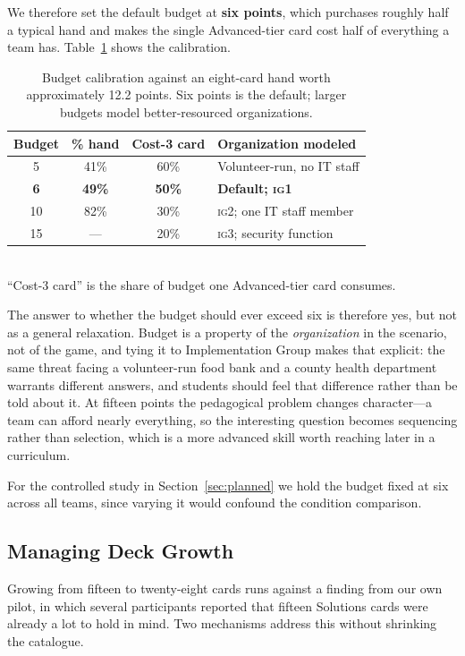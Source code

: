 \documentclass[10pt,twocolumn,letterpaper]{article}
\newcommand{\ig}[1]{\textsc{ig#1}}
\begin{document}
We therefore set the default budget at \textbf{six points}, which purchases
roughly half a typical hand and makes the single Advanced-tier card cost half of
everything a team has. Table~\ref{tab:budget} shows the calibration.

\begin{table}[h]
\centering
\caption{Budget calibration against an eight-card hand worth approximately 12.2
points. Six points is the default; larger budgets model better-resourced
organizations.}
\label{tab:budget}
\footnotesize
\begin{tabular}{@{}c c c l@{}}
\toprule
\textbf{Budget} & \textbf{\% hand} & \textbf{Cost-3 card} & \textbf{Organization modeled} \\
\midrule
5  & 41\% & 60\% & Volunteer-run, no IT staff \\
\textbf{6}  & \textbf{49\%} & \textbf{50\%} & \textbf{Default; \ig{1}} \\
10 & 82\% & 30\% & \ig{2}; one IT staff member \\
15 & --- & 20\% & \ig{3}; security function \\
\bottomrule
\end{tabular}
\\[0.3em]{\footnotesize ``Cost-3 card'' is the share of budget one Advanced-tier card consumes.}
\end{table}

The answer to whether the budget should ever exceed six is therefore yes, but
not as a general relaxation. Budget is a property of the \emph{organization} in
the scenario, not of the game, and tying it to Implementation Group makes that
explicit: the same threat facing a volunteer-run food bank and a county health
department warrants different answers, and students should feel that difference
rather than be told about it. At fifteen points the pedagogical problem changes
character---a team can afford nearly everything, so the interesting question
becomes sequencing rather than selection, which is a more advanced skill worth
reaching later in a curriculum.

For the controlled study in Section~\ref{sec:planned} we hold the budget fixed
at six across all teams, since varying it would confound the condition
comparison.

\subsection{Managing Deck Growth}

Growing from fifteen to twenty-eight cards runs against a finding from our own pilot,
in which several participants reported that fifteen Solutions cards were already
a lot to hold in mind. Two mechanisms address this without shrinking the
catalogue.
\end{document}
